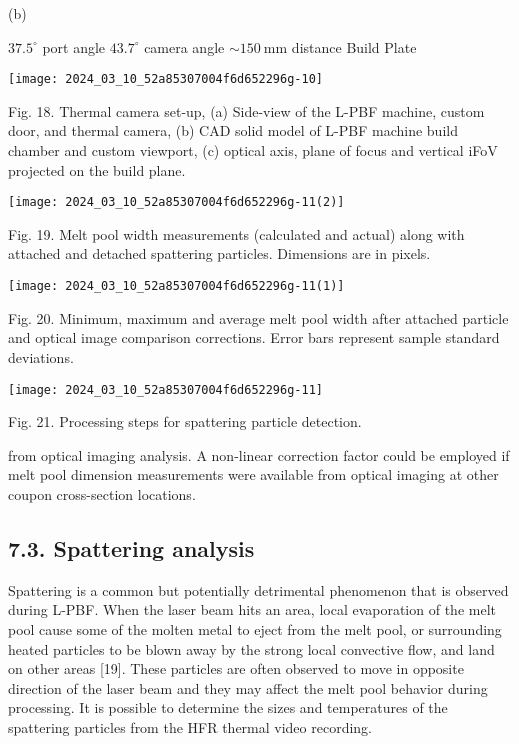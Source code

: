 \documentclass[10pt]{article}
\begin{document}
(b)

$37.5^{\circ}$ port angle $43.7^{\circ}$ camera angle $\sim 150 \mathrm{~mm}$ distance Build Plate

\begin{center}
\texttt{[image: 2024\_03\_10\_52a85307004f6d652296g-10]}
\end{center}

Fig. 18. Thermal camera set-up, (a) Side-view of the L-PBF machine, custom door, and thermal camera, (b) CAD solid model of L-PBF machine build chamber and custom viewport, (c) optical axis, plane of focus and vertical iFoV projected on the build plane.

\begin{center}
\texttt{[image: 2024\_03\_10\_52a85307004f6d652296g-11(2)]}
\end{center}

Fig. 19. Melt pool width measurements (calculated and actual) along with attached and detached spattering particles. Dimensions are in pixels.

\begin{center}
\texttt{[image: 2024\_03\_10\_52a85307004f6d652296g-11(1)]}
\end{center}

Fig. 20. Minimum, maximum and average melt pool width after attached particle and optical image comparison corrections. Error bars represent sample standard deviations.

\begin{center}
\texttt{[image: 2024\_03\_10\_52a85307004f6d652296g-11]}
\end{center}

Fig. 21. Processing steps for spattering particle detection.

from optical imaging analysis. A non-linear correction factor could be employed if melt pool dimension measurements were available from optical imaging at other coupon cross-section locations.

\subsection*{7.3. Spattering analysis}
Spattering is a common but potentially detrimental phenomenon that is observed during L-PBF. When the laser beam hits an area, local evaporation of the melt pool cause some of the molten metal to eject from the melt pool, or surrounding heated particles to be blown away by the strong local convective flow, and land on other areas [19]. These particles are often observed to move in opposite direction of the laser beam and they may affect the melt pool behavior during processing. It is possible to determine the sizes and temperatures of the spattering particles from the HFR thermal video recording.
\end{document}
